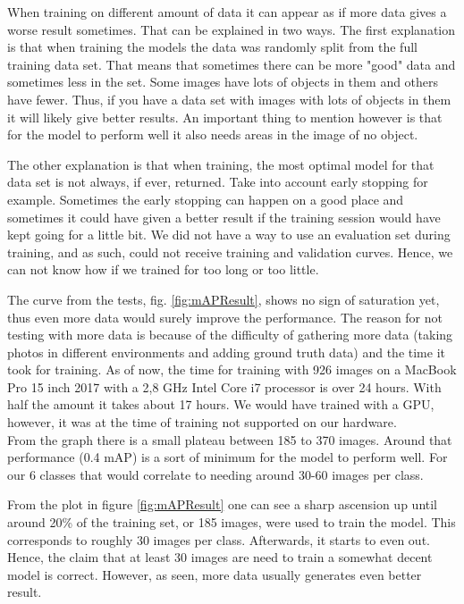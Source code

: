 When training on different amount of data it can appear as if more data gives a worse
result sometimes. That can be explained in two ways. The first explanation is that when
training the models the data was randomly split from the full training data set. That 
means that sometimes there can be more "good" data and sometimes less in the set.
Some images have lots of objects in them and others have fewer. Thus, if you have a
data set with images with lots of objects in them it will likely give better results.
An important thing to mention however is that for the model to perform well it also needs
areas in the image of no object.

The other explanation is that when training, the most optimal model for that data set is
not always, if ever, returned. Take into account early stopping for example.
Sometimes the early stopping can happen on a good place and sometimes it could have
given a better result if the training session would have kept going for a little bit. We did not have a way to use an evaluation set during training, and as such, could not receive training and validation curves. Hence, we can not know how if we trained for too long or too little.

The curve from the tests, fig. \ref{fig:mAPResult}, shows no sign of saturation yet, thus even more data would
surely improve the performance. The reason for not testing with more data is because
of the difficulty of gathering more data (taking photos in different environments and 
adding ground truth data) and the time it took for training.
As of now, the time for training with 926 images on a MacBook Pro 15 inch 2017 with a 2,8 GHz
Intel Core i7 processor is over 24 hours. With half the amount it takes about 17 hours. We would have trained with a GPU, however, it was at the time of training not supported on our hardware.\\

From the graph there is a small plateau between 185 to 370 images. Around that
performance (0.4 mAP) is a sort of minimum for the model to perform well.
For our 6 classes that would correlate to needing around 30-60 images per class.

From the plot in figure \ref{fig:mAPResult} one can see a sharp ascension up until around  20\% of the training set, or 185 images, were used to train the model. This corresponds to roughly 30 images per class. Afterwards, it starts to even out. Hence, the claim that at least 30 images are need to train a somewhat decent model is correct. However, as seen, more data usually generates even better result.

\newpage